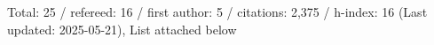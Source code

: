 Total: 25 / refereed: 16 / first author: 5 / citations: 2,375 / h-index: 16 (Last updated: 2025-05-21), List attached below